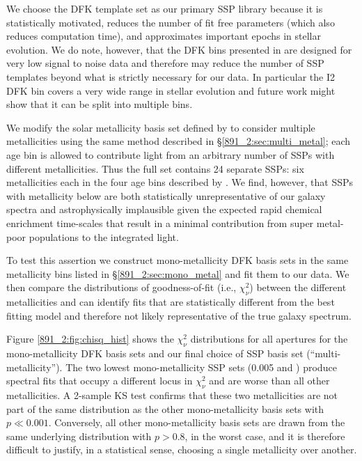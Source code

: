 We choose the  DFK template set as our primary
SSP library because it is statistically motivated, reduces the number
of fit free parameters (which also reduces computation time), and
approximates important epochs in stellar evolution. We do note,
however, that the DFK bins presented in  are
designed for very low signal to noise data and therefore may reduce
the number of SSP templates beyond what is strictly necessary for our
data. In particular the I2 DFK bin covers a very wide range in stellar
evolution and future work might show that it can be split into
multiple bins.


We modify the solar metallicity basis set defined by
 to consider multiple metallicities using the same
method described in \S\ref{891_2:sec:multi_metal}; each age bin is
allowed to contribute light from an arbitrary number of SSPs with
different metallicities. Thus the full set contains 24 separate SSPs:
six metallicities each in the four age bins described by
. We find, however, that SSPs with metallicity
below  are both statistically unrepresentative of our
galaxy spectra and astrophysically implausible given the expected
rapid chemical enrichment time-scales that result in a minimal
contribution from super metal-poor populations to the integrated
light.

To test this assertion we construct mono-metallicity DFK basis sets in
the same metallicity bins listed in \S\ref{891_2:sec:mono_metal} and fit
them to our data. We then compare the distributions of goodness-of-fit
(i.e., $\chi^2_\nu$) between the different metallicities and can
identify fits that are statistically different from the best fitting
model and therefore not likely representative of the true galaxy
spectrum.

Figure \ref{891_2:fig:chisq_hist} shows the $\chi^2_\nu$ distributions for
all \GP apertures for the mono-metallicity DFK basis sets and our
final choice of SSP basis set (``multi-metallicity''). The two lowest
mono-metallicity SSP sets (0.005 and ) produce
spectral fits that occupy a different locus in $\chi^2_\nu$ and are
worse than all other metallicities. A 2-sample KS test confirms that
these two metallicities are not part of the same distribution as the
other mono-metallicity basis sets with $p \ll 0.001$. Conversely, all
other mono-metallicity basis sets are drawn from the same underlying
distribution with $p > 0.8$, in the worst case, and it is therefore
difficult to justify, in a statistical sense, choosing a single
metallicity over another. 

